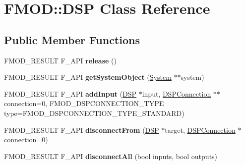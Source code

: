\hypertarget{class_f_m_o_d_1_1_d_s_p}{\section{F\+M\+O\+D\+:\+:D\+S\+P Class Reference}
\label{class_f_m_o_d_1_1_d_s_p}
}
\subsection*{Public Member Functions}
\begin{DoxyCompactItemize}
\item 
\hypertarget{class_f_m_o_d_1_1_d_s_p_a4ffd9dbcf1b0119a2ab94d27744ee033}{F\+M\+O\+D\+\_\+\+R\+E\+S\+U\+L\+T F\+\_\+\+A\+P\+I {\bfseries release} ()}\label{class_f_m_o_d_1_1_d_s_p_a4ffd9dbcf1b0119a2ab94d27744ee033}

\item 
\hypertarget{class_f_m_o_d_1_1_d_s_p_a06bef2d5b365de903e12fff814da31c7}{F\+M\+O\+D\+\_\+\+R\+E\+S\+U\+L\+T F\+\_\+\+A\+P\+I {\bfseries get\+System\+Object} (\hyperlink{class_f_m_o_d_1_1_system}{System} $\ast$$\ast$system)}\label{class_f_m_o_d_1_1_d_s_p_a06bef2d5b365de903e12fff814da31c7}

\item 
\hypertarget{class_f_m_o_d_1_1_d_s_p_abc7912fc7a012c1d47254a9ef8abbe73}{F\+M\+O\+D\+\_\+\+R\+E\+S\+U\+L\+T F\+\_\+\+A\+P\+I {\bfseries add\+Input} (\hyperlink{class_f_m_o_d_1_1_d_s_p}{D\+S\+P} $\ast$input, \hyperlink{class_f_m_o_d_1_1_d_s_p_connection}{D\+S\+P\+Connection} $\ast$$\ast$connection=0, F\+M\+O\+D\+\_\+\+D\+S\+P\+C\+O\+N\+N\+E\+C\+T\+I\+O\+N\+\_\+\+T\+Y\+P\+E type=F\+M\+O\+D\+\_\+\+D\+S\+P\+C\+O\+N\+N\+E\+C\+T\+I\+O\+N\+\_\+\+T\+Y\+P\+E\+\_\+\+S\+T\+A\+N\+D\+A\+R\+D)}\label{class_f_m_o_d_1_1_d_s_p_abc7912fc7a012c1d47254a9ef8abbe73}

\item 
\hypertarget{class_f_m_o_d_1_1_d_s_p_aecd8d581ef5bfc1c04b8b5859b7920f8}{F\+M\+O\+D\+\_\+\+R\+E\+S\+U\+L\+T F\+\_\+\+A\+P\+I {\bfseries disconnect\+From} (\hyperlink{class_f_m_o_d_1_1_d_s_p}{D\+S\+P} $\ast$target, \hyperlink{class_f_m_o_d_1_1_d_s_p_connection}{D\+S\+P\+Connection} $\ast$connection=0)}\label{class_f_m_o_d_1_1_d_s_p_aecd8d581ef5bfc1c04b8b5859b7920f8}

\item 
\hypertarget{class_f_m_o_d_1_1_d_s_p_a3eb9cfc992a069357bbebeafffad9c8e}{F\+M\+O\+D\+\_\+\+R\+E\+S\+U\+L\+T F\+\_\+\+A\+P\+I {\bfseries disconnect\+All} (bool inputs, bool outputs)}\label{class_f_m_o_d_1_1_d_s_p_a3eb9cfc992a069357bbebeafffad9c8e}


\end{DoxyCompactItemize}
